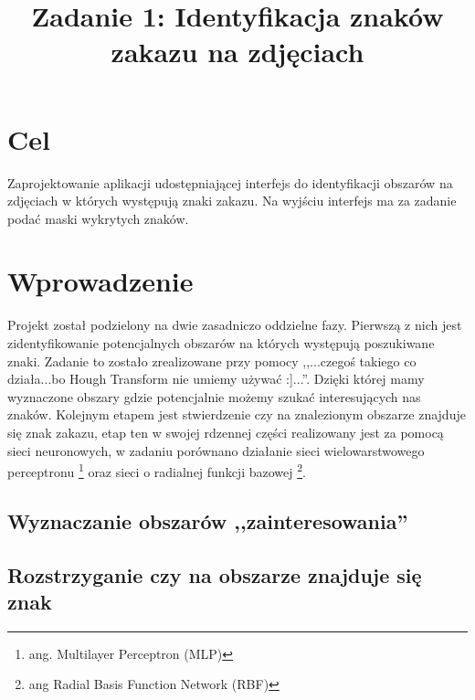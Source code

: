 \documentclass{classrep}
\author{
  \studentinfo{Autor 1}{nr albumu 1} \and
  \studentinfo{Autor 2}{nr albumu 2} \and
}
\title{Zadanie 1: Identyfikacja znaków zakazu na zdjęciach}
\begin{document}
\maketitle



\section{Cel}
Zaprojektowanie aplikacji udostępniającej interfejs do identyfikacji obszarów na zdjęciach w których występują znaki zakazu. Na wyjściu interfejs ma za zadanie podać maski wykrytych znaków.

\section{Wprowadzenie}

Projekt został podzielony na dwie zasadniczo oddzielne fazy. Pierwszą z nich jest zidentyfikowanie potencjalnych obszarów na których występują poszukiwane znaki. Zadanie to zostało zrealizowane przy pomocy ,,...czegoś takiego co działa...bo Hough Transform nie umiemy używać :]...''. Dzięki której mamy wyznaczone obszary gdzie potencjalnie możemy szukać interesujących nas znaków. Kolejnym etapem jest stwierdzenie czy na znalezionym obszarze znajduje się znak zakazu, etap ten w swojej rdzennej części realizowany jest za pomocą sieci neuronowych, w zadaniu porównano działanie sieci wielowarstwowego perceptronu \footnote{ang. Multilayer Perceptron (MLP)} oraz sieci o radialnej funkcji bazowej \footnote{ang Radial Basis Function Network (RBF)}.

\subsection{Wyznaczanie obszarów ,,zainteresowania''}

\subsection{Rozstrzyganie czy na obszarze znajduje się znak}
\end{document}
